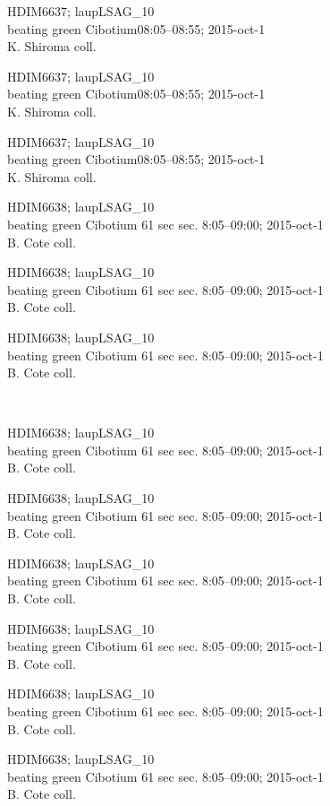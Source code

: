 \documentclass[2pt]{extarticle}
\begin{document}
\noindent
\parbox{0.16\textwidth}{\tiny \raggedright \rule[-0.3\baselineskip]{0pt}{10pt}HDIM6637; laupLSAG\_10\\ beating green Cibotium08:05--08:55; 2015-oct-1\\ K. Shiroma coll.}
\parbox{0.16\textwidth}{\tiny \raggedright \rule[-0.3\baselineskip]{0pt}{10pt}HDIM6637; laupLSAG\_10\\ beating green Cibotium08:05--08:55; 2015-oct-1\\ K. Shiroma coll.}
\parbox{0.16\textwidth}{\tiny \raggedright \rule[-0.3\baselineskip]{0pt}{10pt}HDIM6637; laupLSAG\_10\\ beating green Cibotium08:05--08:55; 2015-oct-1\\ K. Shiroma coll.}
\parbox{0.16\textwidth}{\tiny \raggedright \rule[-0.3\baselineskip]{0pt}{10pt}HDIM6638; laupLSAG\_10\\ beating green Cibotium 61 sec sec. 8:05--09:00; 2015-oct-1\\ B. Cote coll.}
\parbox{0.16\textwidth}{\tiny \raggedright \rule[-0.3\baselineskip]{0pt}{10pt}HDIM6638; laupLSAG\_10\\ beating green Cibotium 61 sec sec. 8:05--09:00; 2015-oct-1\\ B. Cote coll.}
\parbox{0.16\textwidth}{\tiny \raggedright \rule[-0.3\baselineskip]{0pt}{10pt}HDIM6638; laupLSAG\_10\\ beating green Cibotium 61 sec sec. 8:05--09:00; 2015-oct-1\\ B. Cote coll.} \\ 
\vspace{0.001in} 

\noindent
\parbox{0.16\textwidth}{\tiny \raggedright \rule[-0.3\baselineskip]{0pt}{10pt}HDIM6638; laupLSAG\_10\\ beating green Cibotium 61 sec sec. 8:05--09:00; 2015-oct-1\\ B. Cote coll.}
\parbox{0.16\textwidth}{\tiny \raggedright \rule[-0.3\baselineskip]{0pt}{10pt}HDIM6638; laupLSAG\_10\\ beating green Cibotium 61 sec sec. 8:05--09:00; 2015-oct-1\\ B. Cote coll.}
\parbox{0.16\textwidth}{\tiny \raggedright \rule[-0.3\baselineskip]{0pt}{10pt}HDIM6638; laupLSAG\_10\\ beating green Cibotium 61 sec sec. 8:05--09:00; 2015-oct-1\\ B. Cote coll.}
\parbox{0.16\textwidth}{\tiny \raggedright \rule[-0.3\baselineskip]{0pt}{10pt}HDIM6638; laupLSAG\_10\\ beating green Cibotium 61 sec sec. 8:05--09:00; 2015-oct-1\\ B. Cote coll.}
\parbox{0.16\textwidth}{\tiny \raggedright \rule[-0.3\baselineskip]{0pt}{10pt}HDIM6638; laupLSAG\_10\\ beating green Cibotium 61 sec sec. 8:05--09:00; 2015-oct-1\\ B. Cote coll.}
\parbox{0.16\textwidth}{\tiny \raggedright \rule[-0.3\baselineskip]{0pt}{10pt}HDIM6638; laupLSAG\_10\\ beating green Cibotium 61 sec sec. 8:05--09:00; 2015-oct-1\\ B. Cote coll.} \\ 
\vspace{0.001in} 
\end{document}
